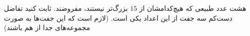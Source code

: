     \p 
هشت عدد طبیعی که هیچ‌کدامشان از
$15$
بزرگ‌تر نیستند، مفروضند. ثابت کنید تفاضل دست‌کم سه جفت از این اعداد یکی است. (لازم است که این جفت‌ها به صورت مجموعه‌های جدا از هم باشند)